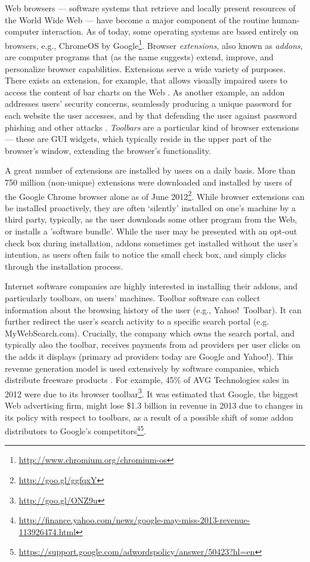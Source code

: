 \documentclass[ijoc,nonblindrev]{informs3} %
\numberwithin{equation}{subsection}
\begin{document}
Web browsers --- software systems that retrieve and locally present resources of the World Wide Web --- have become a major component of the routine human-computer interaction. As of today, some operating systems are based entirely on browsers, e.g., ChromeOS by Google\footnote{\url{http://www.chromium.org/chromium-os}}. Browser {\it extensions}, also known as {\it addons}, are computer programs that (as the name suggests) extend, improve, and personalize browser capabilities. Extensions serve a wide variety of purposes.
There exists an extension, for example, that allows visually impaired users to access the content of bar charts on the Web \citep{elzer2007browser}. As another example, an addon addresses users' security concerns, seamlessly producing a unique password for each website the user accesses, and by that defending the user against password phishing and other attacks \citep{ross2005stronger}. {\it Toolbars} are a particular kind of browser extensions --- these are GUI widgets, which typically reside in the upper part of the browser's window, extending the browser's functionality. 

A great number of extensions are installed by users on a daily basis. More than 750 million (non-unique) extensions were downloaded and installed by users of the Google Chrome browser alone as of June 2012\footnote{\url{http://goo.gl/ggfqxY}}. While browser extensions can be installed proactively, they are often `silently' installed on one's machine by a third party, typically, as the user downloads some other program from the Web, or installs a 'software bundle'. While the user may be presented with an opt-out check box during installation, addons sometimes get installed without the user's intention, as users often fails to notice the small check box, and simply clicks through the installation process.  

Internet software companies are highly interested in installing their addons, and particularly toolbars, on users' machines. Toolbar software can collect information about the browsing history of the user (e.g., Yahoo!~Toolbar). It can further redirect the user's search activity to a specific search portal (e.g. MyWebSearch.com). Crucially, the company which owns the search portal, and typically also the toolbar, receives payments from ad providers per user clicks on the adds it displays (primary ad providers today are Google and Yahoo!). This revenue generation model is used extensively by software companies, which distribute freeware products \citep{leontiadis2012don}. For example, 45\% of AVG Technologies sales in 2012 were due to its browser toolbar\footnote{\url{http://goo.gl/ONZ9u}}.  It was estimated that Google, the biggest Web advertising firm, might lose \$1.3 billion in revenue in 2013 due to changes in its policy with respect to toolbars, as a result of a possible shift of some addon distributors to Google's competitors\footnote{\url{http://finance.yahoo.com/news/google-may-miss-2013-revenue-113926474.html}}\footnote{\url{https://support.google.com/adwordspolicy/answer/50423?hl=en}}.
\end{document}
